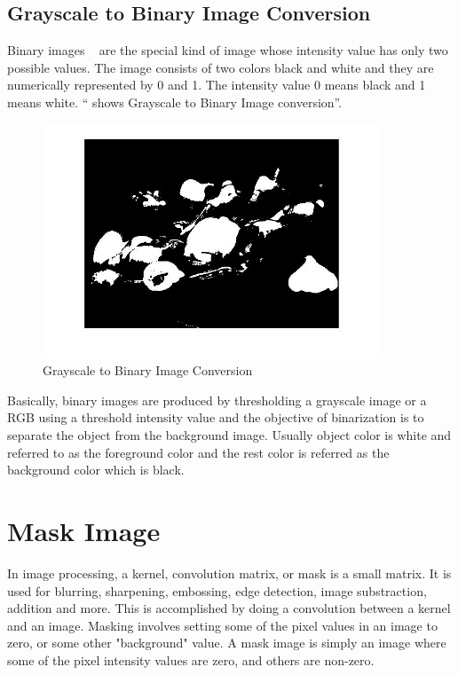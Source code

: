 \subsection{Grayscale to Binary Image Conversion}
Binary images ~\cite{russ1995image} are the special kind of image whose intensity value has only two possible values. The image consists of two colors black and white and they are numerically represented by 0 and 1. The intensity value 0 means black and 1 means white. `` shows Grayscale to Binary Image conversion''.
\\

\begin{figure}[h]
  \centering
  \includegraphics[width=0.9\textwidth]{figures/2_2_2}
  \caption{Grayscale to Binary Image Conversion}
  \label{fig:Grayscale to Binary Image Conversion}
\end{figure}

Basically, binary images are produced by thresholding a grayscale image or a  RGB  using a threshold intensity value and the objective of binarization is to separate the object from the background  image. Usually object color is white and referred to as the foreground color and the rest color is referred as the background color which is black. 

\section{Mask Image}

In image processing, a kernel, convolution matrix, or mask is a small matrix. It is used for blurring, sharpening, embossing, edge detection, image substraction, addition and more. This is accomplished by doing a convolution between a kernel and an image.  Masking involves setting some of the pixel values in an image to zero, or some other "background" value. A mask image is simply an image where some of the pixel intensity values are zero, and others are non-zero.


